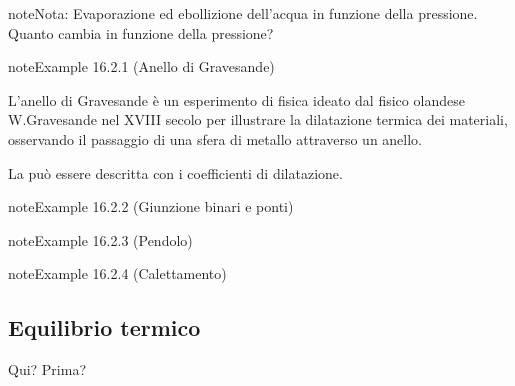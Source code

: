 \documentclass[letterpaper,10pt,italian]{jupyterBook}
\begin{document}
\begin{sphinxadmonition}{note}{Nota:}
\sphinxAtStartPar
Evaporazione ed ebollizione dell’acqua in funzione della pressione. Quanto cambia in funzione della pressione?
\end{sphinxadmonition}


\label{ch/thermodynamics/foundation-experiments:thermodynamics:history:th-expansion:gravesande}
\begin{sphinxadmonition}{note}{Example 16.2.1 (Anello di Gravesande)}



\sphinxAtStartPar
L’anello di Gravesande è un esperimento di fisica ideato dal fisico olandese W.Gravesande nel XVIII secolo per illustrare la dilatazione termica dei materiali, osservando il passaggio di una sfera di metallo attraverso un anello.

\sphinxAtStartPar
La {\hyperref[\detokenize{ch/thermodynamics/elastic-solid-1d:physics-hs-thermodynamics-matter-elastic-1d-dilation}]{}} può essere descritta con i coefficienti di dilatazione.
\end{sphinxadmonition}
\label{ch/thermodynamics/foundation-experiments:thermodynamics:history:th-expansion:junctions}
\begin{sphinxadmonition}{note}{Example 16.2.2 (Giunzione binari e ponti)}


\end{sphinxadmonition}
\label{ch/thermodynamics/foundation-experiments:thermodynamics:history:th-expansion:pendulum}
\begin{sphinxadmonition}{note}{Example 16.2.3 (Pendolo)}


\end{sphinxadmonition}
\label{ch/thermodynamics/foundation-experiments:thermodynamics:history:th-exapnsion:interference}
\begin{sphinxadmonition}{note}{Example 16.2.4 (Calettamento)}


\end{sphinxadmonition}




\subsection{Equilibrio termico}
\label{\detokenize{ch/thermodynamics/foundation-experiments:equilibrio-termico}}\label{\detokenize{ch/thermodynamics/foundation-experiments:physics-hs-thermodynamics-foundation-experiments-th-equilibrium}}
\sphinxAtStartPar
  Qui? Prima? 
\end{document}
